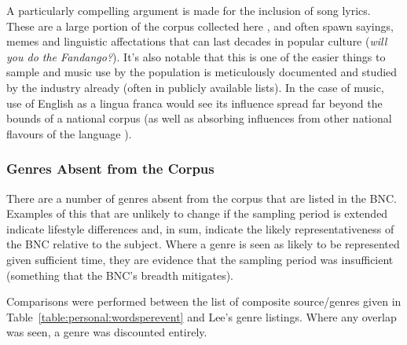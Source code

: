 A particularly compelling argument is made for the inclusion of song lyrics.  These are a large portion of the corpus collected here , and often spawn sayings, memes and linguistic affectations that can last decades in popular culture (\textit{will you do the Fandango?}).  It's also notable that this is one of the easier things to sample and music use by the population is meticulously documented and studied by the industry already (often in publicly available lists).  In the case of music, use of English as a lingua franca would see its influence spread far beyond the bounds of a national corpus (as well as absorbing influences from other national flavours of the language%
).




\subsubsection{Genres Absent from the Corpus}
There are a number of genres absent from the corpus that are listed in the BNC.  Examples of this that are unlikely to change if the sampling period is extended indicate lifestyle differences and, in sum, indicate the likely representativeness of the BNC relative to the subject.  Where a genre is seen as likely to be represented given sufficient time, they are evidence that the sampling period was insufficient (something that the BNC's breadth mitigates).

Comparisons were performed between the list of composite source/genres given in Table~\ref{table:personal:wordsperevent} and Lee's genre listings.  Where any overlap was seen, a genre was discounted entirely.


